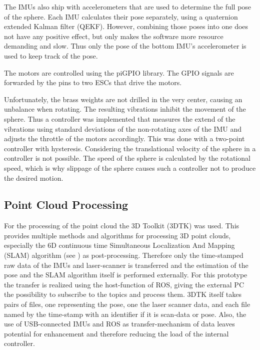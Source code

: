 The IMUs also ship with accelerometers that are used to determine the full pose of the sphere.
Each IMU calculates their pose separately, using a quaternion extended Kalman filter (QEKF).
However, combining those poses into one does not have any positive effect, but only makes the software more resource demanding and slow.
Thus only the pose of the bottom IMU's accelerometer is used to keep track of the pose.

The motors are controlled using the piGPIO library. The GPIO signals are forwarded by the pins to two ESCs that drive the motors. 

Unfortunately, the brass weights are not drilled in the very center, causing an unbalance when rotating.
The resulting vibrations inhibit the movement of the sphere.
Thus a controller was implemented that measures the extend of the vibrations using standard deviations of the non-rotating axes of the IMU and adjusts the throttle of the motors accordingly.
This was done with a two-point controller with hysteresis.
Considering the translational velocity of the sphere in a controller is not possible.
The speed of the sphere is calculated by the rotational speed, which is why slippage of the sphere causes such a controller not to produce the desired motion. 

\subsection{Point Cloud Processing}                                                                                                                                                                                  
\label{sec:TechnicalApproach:pointcloudprocessing}
For the processing of the point cloud the 3D Toolkit (3DTK) was used.
This provides multiple methods and algorithms for processing 3D point clouds, especially the 6D continuous time Simultaneous Localization And Mapping (SLAM) algorithm (see \cite{3DARCH2017_1, LS2019}) as post-processing.
Therefore only the time-stamped raw data of the IMUs and laser-scanner is transferred and the estimation of the pose and the SLAM algorithm itself is performed externally.
For this prototype the transfer is realized using the host-function of ROS, giving the external PC the possibility to subscribe to the topics and process them.
3DTK itself takes pairs of files, one representing the pose, one the laser scanner data, and each file named by the time-stamp with an identifier if it is scan-data or pose.
Also, the use of USB-connected IMUs and ROS as transfer-mechanism of data leaves potential for enhancement and therefore reducing the load of the internal controller.